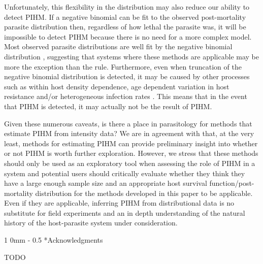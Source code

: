 \documentclass[12pt, a4paper]{article}
\makeatletter
\renewcommand{\section}{\@startsection
{section}%
{1}%
{0mm}%
{-\baselineskip}%
{0.5\baselineskip}%
{\normalfont\bf\large}} %
\makeatother
\begin{document}
Unfortunately, this
flexibility in the distribution may also reduce our ability to detect PIHM. If
a negative binomial can be fit to the observed post-mortality parasite
distribution then, regardless of how lethal the parasite was, it will be
impossible to detect PIHM because there is no need for a more complex model.
Most observed parasite distributions are well fit by the negative binomial distribution \citep{Shaw1998}, suggesting
that systems where these methods are applicable may be more the exception than
the rule.  Furthermore, even when truncation of the negative binomial distribution is detected, it may be caused by other
processes such as within host density dependence, age dependent variation in host
resistance and/or heterogeneous infection rates \citep{McCallum2000a,Anderson1982a,Rousset1996}.  This means that in the event
that PIHM is detected, it may actually not be the result of PIHM.

Given these numerous caveats, is there a place in parasitology for methods that
estimate PIHM from intensity data?  We are in agreement with
\cite{Lester1984} that, at the very least, methods for estimating PIHM can
provide preliminary insight into whether or not PIHM is worth further
exploration.  However, we stress that these methods should only be used as an
exploratory tool when assessing the role of PIHM in a system and potential
users should critically evaluate whether they think they have a large enough
sample size and an appropriate host survival function/post-mortality distribution for the methods developed
in this paper to be applicable.  Even if they are applicable, inferring PIHM
from distributional data is no substitute for field experiments
and an in depth understanding of the natural history of the host-parasite
system under consideration.

\section*{Acknowledgments}

TODO


\singlespacing



\newpage

\renewcommand{\arraystretch}{1.2}
\end{document}
